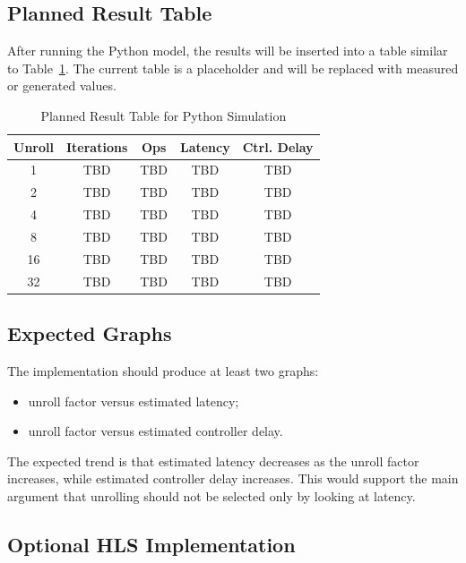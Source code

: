 \documentclass[conference]{IEEEtran}
\begin{document}
\subsection{Planned Result Table}

After running the Python model, the results will be inserted into a table similar to Table~\ref{tab:plannedresults}. The current table is a placeholder and will be replaced with measured or generated values.

\begin{table}[h]
\centering
\caption{Planned Result Table for Python Simulation}
\label{tab:plannedresults}
\begin{tabular}{|c|c|c|c|c|}
\hline
\textbf{Unroll} & \textbf{Iterations} & \textbf{Ops} & \textbf{Latency} & \textbf{Ctrl. Delay} \\
\hline
1 & TBD & TBD & TBD & TBD \\
2 & TBD & TBD & TBD & TBD \\
4 & TBD & TBD & TBD & TBD \\
8 & TBD & TBD & TBD & TBD \\
16 & TBD & TBD & TBD & TBD \\
32 & TBD & TBD & TBD & TBD \\
\hline
\end{tabular}
\end{table}

\subsection{Expected Graphs}

The implementation should produce at least two graphs:

\begin{itemize}
    \item unroll factor versus estimated latency;
    \item unroll factor versus estimated controller delay.
\end{itemize}

The expected trend is that estimated latency decreases as the unroll factor increases, while estimated controller delay increases. This would support the main argument that unrolling should not be selected only by looking at latency.

\subsection{Optional HLS Implementation}
\end{document}
